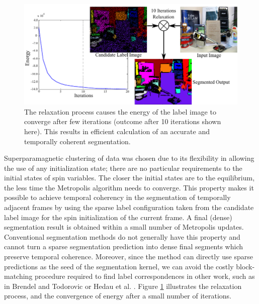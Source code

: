 \begin{figure}
\label{fig:Convergence}
\centering
\includegraphics[scale = 0.82]{figures/ECCV2012/ConvergenceFig2.pdf}
\caption[Relaxation Convergence]{The relaxation process causes the energy of the label image to converge after few iterations (outcome after 10 iterations shown here). This results in efficient calculation of an accurate and temporally coherent segmentation.}
\label{fig:Convergence}
\end{figure}

Superparamagnetic clustering of data was chosen due to its flexibility in allowing the use of any initialization state; there are no particular requirements to the initial states of spin variables. The closer the initial states are to the equilibrium, the less time the Metropolis algorithm needs to converge. This property makes it possible to achieve temporal coherency in the segmentation of temporally adjacent frames by using the sparse label configuration taken from the candidate label image for the spin initialization of the current frame. A final (dense) segmentation result is obtained within a small number of Metropolis updates. Conventional segmentation methods do not generally have this property and cannot turn a sparse segmentation prediction into dense final segments which preserve temporal coherence. Moreover, since the method can directly use sparse predictions as the seed of the segmentation kernel, we can avoid the costly block-matching procedure required to find label correspondences in other 
work, such as in Brendel and Todorovic \cite{SegTrackRegions} or Hedau et al.  \cite{MatchingUnstable}. Figure \ref{fig:Convergence} illustrates the relaxation process, and the convergence of energy after a small number of iterations. 

